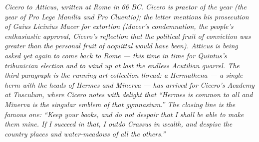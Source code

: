 
\textit{Cicero to Atticus, written at Rome in 66 BC. Cicero
is praetor of the year (the year of \textit{Pro Lege Manilia}
and \textit{Pro Cluentio}); the letter mentions his prosecution
of Gaius Licinius Macer for extortion (Macer's condemnation,
the people's enthusiastic approval, Cicero's reflection that
the political fruit of conviction was greater than the personal
fruit of acquittal would have been). Atticus is being asked
yet again to come back to Rome --- this time in time for
Quintus's tribunician election and to wind up at last the
endless Acutilian quarrel. The third paragraph is the running
art-collection thread: a Hermathena --- a single herm with the
heads of Hermes and Minerva --- has arrived for Cicero's
Academy at Tusculum, where Cicero notes with delight that
``Hermes is common to all and Minerva is the singular emblem
of that gymnasium.'' The closing line is the famous one:
``Keep your books, and do not despair that I shall be able to
make them mine. If I succeed in that, I outdo Crassus in
wealth, and despise the country places and water-meadows of
all the others.''}
